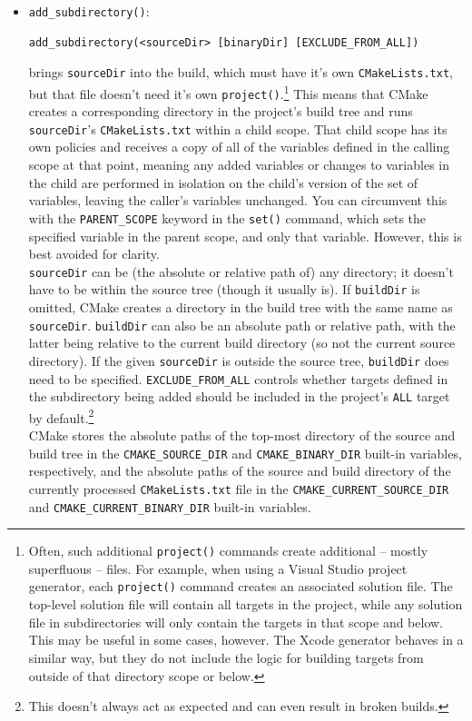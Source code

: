 \documentclass[table, xcdraw]{article}%
\begin{document}
\begin{itemize}
\item \texttt{add_subdirectory()}:

\begin{verbatim}
add_subdirectory(<sourceDir> [binaryDir] [EXCLUDE_FROM_ALL])
\end{verbatim}

brings \texttt{sourceDir} into the build, which must have it's own \texttt{CMakeLists.txt}, but that file doesn't need it's own \texttt{project()}.\footnote{Often, such additional \texttt{project()} commands create additional -- mostly superfluous -- files. For example, when using a Visual Studio project generator, each \texttt{project()} command creates an associated solution file. The top-level solution file will contain all targets in the project, while any solution file in subdirectories will only contain the targets in that scope and below. This may be useful in some cases, however. The Xcode generator behaves in a similar way, but they do not include the logic for building targets from outside of that directory scope or below.} This means that CMake creates a corresponding directory in the project’s build tree and runs \texttt{sourceDir}'s \texttt{CMakeLists.txt} within a child scope. That child scope has its own policies and receives a copy of all of the variables defined in the calling scope at that point, meaning any added variables or changes to variables in the child are performed in isolation on the child’s version of the set of variables, leaving the caller’s variables unchanged. You can circumvent this with the \texttt{PARENT_SCOPE} keyword in the \texttt{set()} command, which sets the specified variable in the parent scope, and only that variable. However, this is best avoided for clarity.\\
\texttt{sourceDir} can be (the absolute or relative path of) any directory; it doesn't have to be within the source tree (though it usually is). If \texttt{buildDir} is omitted, CMake creates a directory in the build tree with the same name as \texttt{sourceDir}. \texttt{buildDir} can also be an absolute path or relative path, with the latter being relative to the current build directory (so not the current source directory). If the given \texttt{sourceDir} is outside the source tree, \texttt{buildDir} does need to be specified. \texttt{EXCLUDE_FROM_ALL} controls whether targets defined in the subdirectory being added should be included in the project’s \texttt{ALL} target by default.\footnote{This doesn’t always act as expected and can even result in broken builds.}\\
CMake stores the absolute paths of the top-most directory of the source and build tree in the \texttt{CMAKE_SOURCE_DIR} and \texttt{CMAKE_BINARY_DIR} built-in variables, respectively, and the absolute paths of the source and build directory of the currently processed \texttt{CMakeLists.txt} file in the \texttt{CMAKE_CURRENT_SOURCE_DIR} and \texttt{CMAKE_CURRENT_BINARY_DIR} built-in variables.


\end{itemize}
\end{document}
